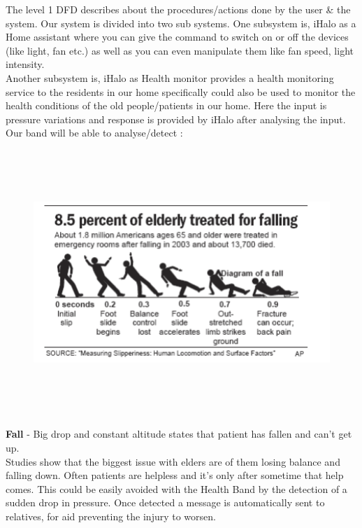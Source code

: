 The level 1 DFD describes about the procedures/actions done by the user \& the system. Our system is divided into two sub systems. One subsystem is, iHalo as a Home assistant where you can give the command to switch on or off the devices (like light, fan etc.) as well as you can even manipulate them like fan speed, light intensity.\\
Another subsystem is, iHalo as Health monitor provides a health monitoring service to the residents in our home specifically could also be used to monitor the health conditions of the old people/patients in our home. Here the input is pressure variations and response is provided by iHalo after analysing the input.\\
Our band will be able to analyse/detect :
\begin{figure}[H]
	
	\centering
	\includegraphics[width=\linewidth,height=10cm] {./images/p4.png}

	\label{manual}
\end{figure}
\textbf{Fall} - Big drop and constant altitude states that patient has fallen and can't get up.\\
Studies show that the biggest issue with elders are of them losing balance and falling down. Often patients are helpless and it's only after sometime that help comes. This could be easily avoided with the Health Band by the detection of a sudden drop in pressure. Once detected a message is automatically sent to relatives, for aid preventing the injury to worsen.\\
